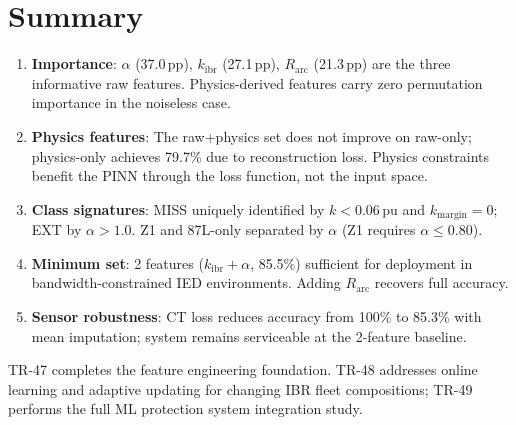 \documentclass[11pt,a4paper]{article}
\begin{document}
\section{Summary}
\label{sec:summary}

\begin{enumerate}
  \item \textbf{Importance}: $\alpha$ (37.0\,pp), $k_\mathrm{ibr}$ (27.1\,pp),
    $R_\mathrm{arc}$ (21.3\,pp) are the three informative raw features.
    Physics-derived features carry zero permutation importance in the noiseless
    case.

  \item \textbf{Physics features}: The raw+physics set does not improve on
    raw-only; physics-only achieves 79.7\% due to reconstruction loss.
    Physics constraints benefit the PINN through the loss function, not the
    input space.

  \item \textbf{Class signatures}: MISS uniquely identified by
    $k<0.06$\,pu and $k_\mathrm{margin}=0$; EXT by $\alpha>1.0$.  Z1 and
    87L-only separated by $\alpha$ (Z1 requires $\alpha\leq0.80$).

  \item \textbf{Minimum set}: 2 features ($k_\mathrm{ibr}+\alpha$, 85.5\%)
    sufficient for deployment in bandwidth-constrained IED environments.
    Adding $R_\mathrm{arc}$ recovers full accuracy.

  \item \textbf{Sensor robustness}: CT loss reduces accuracy from 100\% to
    85.3\% with mean imputation; system remains serviceable at the 2-feature
    baseline.
\end{enumerate}

\noindent
TR-47 completes the feature engineering foundation.  TR-48 addresses online
learning and adaptive updating for changing IBR fleet compositions; TR-49
performs the full ML protection system integration study.



\end{document}
